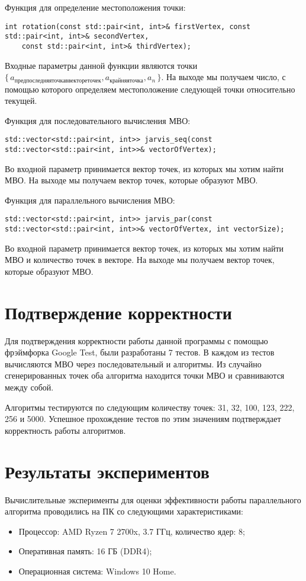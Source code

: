 \documentclass{report}
\begin{document}
\par Функция для определение местоположения точки:
\begin{lstlisting}
int rotation(const std::pair<int, int>& firstVertex, const std::pair<int, int>& secondVertex,
    const std::pair<int, int>& thirdVertex);
\end{lstlisting}
Входные параметры данной функции являются точки $\{\,a_{предпоследняя точка в векторе точек},a_{крайняя точка},a_{n}\,\}$. На выходе мы получаем число, с помощью которого определяем местоположение следующей точки относительно текущей.

\par Функция для последовательного вычисления МВО:
\begin{lstlisting}
std::vector<std::pair<int, int>> jarvis_seq(const std::vector<std::pair<int, int>>& vectorOfVertex);
\end{lstlisting}
Во входной параметр принимается вектор точек, из которых мы хотим найти МВО. На выходе мы получаем вектор точек, которые образуют МВО.

\par Функция для параллельного вычисления МВО:
\begin{lstlisting}
std::vector<std::pair<int, int>> jarvis_par(const std::vector<std::pair<int, int>>& vectorOfVertex, int vectorSize);
\end{lstlisting}
Во входной параметр принимается вектор точек, из которых мы хотим найти МВО и количество точек в векторе. На выходе мы получаем вектор точек, которые образуют МВО.
\newpage

\section*{Подтверждение корректности}
Для подтверждения корректности работы данной программы с помощью фрэймфорка Google Test, были разработаны 7 тестов. В каждом из тестов вычисляются МВО через последовательный и  алгоритмы. Из случайно сгенерированных точек оба алгоритма находится точки МВО и сравниваются между собой. 

\par Алгоритмы тестируются по следующим количеству точек: 31, 32, 100, 123, 222, 256 и 5000. Успешное прохождение тестов по этим значениям подтверждает корректность работы алгоритмов.
\newpage

\section*{Результаты экспериментов}
Вычислительные эксперименты для оценки эффективности работы параллельного алгоритма проводились на ПК со следующими характеристиками:
\begin{itemize}
\item Процессор: AMD Ryzen 7 2700x, 3.7 ГГц, количество ядер: 8;
\item Оперативная память: 16 ГБ (DDR4);
\item Операционная система: Windows 10 Home.
\end{itemize}
\end{document}

